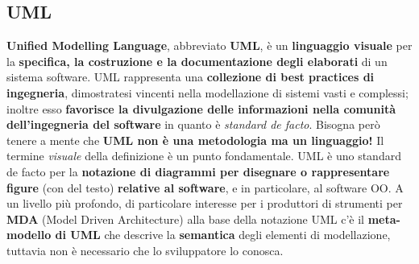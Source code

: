 \documentclass[12pt]{article}
\begin{document}
\subsection{UML}
\textbf{Unified Modelling Language}, abbreviato \textbf{UML}, è un \textbf{linguaggio visuale} per la \textbf{specifica, la costruzione e la documentazione degli elaborati} di un sistema software.
UML rappresenta una \textbf{collezione di best practices di ingegneria}, dimostratesi vincenti nella modellazione di sistemi vasti e complessi; inoltre esso \textbf{favorisce la divulgazione delle informazioni nella comunità dell'ingegneria del software} in quanto è \textit{standard de facto}.
Bisogna però tenere a mente che \textbf{UML non è una metodologia ma un linguaggio!} \newline
Il termine \textit{visuale} della definizione è un punto fondamentale. UML è uno standard de facto per la \textbf{notazione di diagrammi per disegnare o rappresentare figure} (con del testo) \textbf{relative al software}, e in particolare, al software OO.
A un livello più profondo, di particolare interesse per i produttori di strumenti per \textbf{MDA} (Model Driven Architecture) alla base della notazione UML c'è il \textbf{meta-modello di UML} che descrive la \textbf{semantica} degli elementi di modellazione, tuttavia non è necessario che lo sviluppatore lo conosca. 
\end{document}
